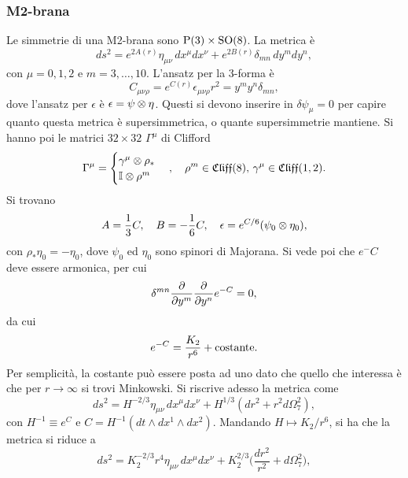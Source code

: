 \subsubsection{M2-brana}
Le simmetrie di una M2-brana sono $\mathrm{P}(3) \times \mathrm{SO}(8)$. La metrica è 
\begin{equation}
    ds^2 = e^{2A(r)}\eta_{\mu\nu}\,dx^\mu dx^\nu + e^{2B(r)}\delta_{mn}\,dy^m dy^n,
\end{equation}
con $\mu = 0,1,2$ e $m = 3,\dots,10$. L'ansatz per la 3-forma è 
\begin{equation}
    C_{\mu\nu\rho} = e^{C(r)}\epsilon_{\mu\nu\rho} r^2 = y^my^n\delta_{mn},
\end{equation}
dove l'ansatz per $\epsilon$ è $\epsilon = \psi \otimes \eta$. Questi si devono inserire in $\delta\psi_\mu = 0$ per capire quanto questa metrica è supersimmetrica, o quante supersimmetrie mantiene. Si hanno poi le matrici $32 \times 32$ $\Gamma^\mu$ di Clifford 
\begin{equation}
    \Gamma^\mu = 
    \begin{cases}
        \gamma^\mu \otimes \rho_* \\
        \mathbb{I} \otimes \rho^m
    \end{cases},\quad \rho^m\in\mathfrak{Cliff}(8),\,\gamma^\mu \in \mathfrak{Cliff}(1,2).
\end{equation}
Si trovano 
\begin{equation}
    A = \frac{1}{3}C,\quad B = -\frac{1}{6}C,\quad \epsilon = e^{C/6}(\psi_0 \otimes \eta_0),
\end{equation}
con $\rho_*\eta_0 = -\eta_0$, dove $\psi_0$ ed $\eta_0$ sono spinori di Majorana. Si vede poi che $e^-C$ deve essere armonica, per cui
\begin{equation}
    \delta^{mn}\frac{\partial}{\partial y^m}\frac{\partial}{\partial y^n}e^{-C} = 0,
\end{equation}
da cui 
\begin{equation}
    e^{-C} = \frac{K_2}{r^6} + \mathrm{costante}.
\end{equation}
Per semplicità, la costante può essere posta ad uno dato che quello che interessa è che per $r \to \infty$ si trovi Minkowski. Si riscrive adesso la metrica come 
\begin{equation}
    ds^2 = H^{-2/3}\eta_{\mu\nu}\,dx^\mu dx^\nu + H^{1/3}(dr^2 + r^2d\Omega_7^2),
\end{equation}
con $H^{-1} \equiv e^C$ e $C = H^{-1}(dt \wedge dx^1 \wedge dx^2)$. Mandando $H \mapsto K_2/r^6$, si ha che la metrica si riduce a 
\begin{equation}
    ds^2 = K_2^{-2/3}r^4\eta_{\mu\nu}\,dx^\mu dx^\nu + K_2^{2/3}\bigg(\frac{dr^2}{r^2} + d\Omega_7^2\bigg),
\end{equation}
